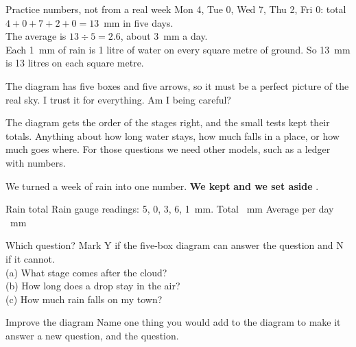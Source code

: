 \begin{worked}{Practice numbers, not from a real week}
Mon 4, Tue 0, Wed 7, Thu 2, Fri 0: total $4+0+7+2+0=13$~mm in five days.\\
The average is $13\div5=2.6$, about 3~mm a day.\\
Each 1~mm of rain is 1 litre of water on every square metre of ground. So 13~mm is 13 litres on each square metre.
\end{worked}

\begin{multix}[hmm]\multixbot[hmm]\tcblower
The diagram has five boxes and five arrows, so it must be a perfect picture of the real sky. I trust it for everything. Am I being careful?
\end{multix}

{The diagram gets the order of the stages right, and the small tests kept their totals.}
{Anything about how long water stays, how much falls in a place, or how much goes where. For those questions we need other models, such as a ledger with numbers.}

\begin{keepbox}
We turned a week of rain into one number. \textbf{We kept} \wline[3.4cm] \textbf{and we set aside} \wline[3.4cm].
\end{keepbox}

\clearpage

\begin{puzzle}{Rain total}
Rain gauge readings: 5, 0, 3, 6, 1~mm. Total \wline[1.6cm]~mm \quad Average per day \wline[1.6cm]~mm
\end{puzzle}

\begin{puzzle}{Which question?}
Mark Y if the five-box diagram can answer the question and N if it cannot.\\
(a) What stage comes after the cloud? \wline[1cm]\\
(b) How long does a drop stay in the air? \wline[1cm]\\
(c) How much rain falls on my town? \wline[1cm]
\end{puzzle}

\begin{puzzle}{Improve the diagram}
Name one thing you would add to the diagram to make it answer a new question, and the question. \wline[6cm]
\end{puzzle}

